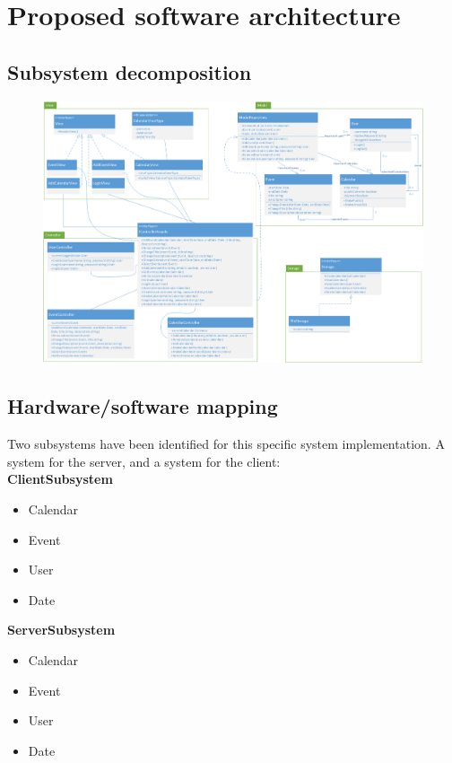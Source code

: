 \documentclass[10pt]{report}
\numberwithin{equation}{section} %
\numberwithin{figure}{section} %
\numberwithin{table}{section} %
\begin{document}
\section{Proposed software architecture}

\subsection{Subsystem decomposition}
\begin{figure}[H]
  \includegraphics[scale=0.40]{classdiagram.png}
\end{figure}

\subsection{Hardware/software mapping}
Two subsystems have been identified for this specific system implementation. A
system for the server, and a system for the client:\\
\textbf{ClientSubsystem}
\begin{itemize}
\item Calendar
\item Event
\item User
\item Date
\end{itemize}

\textbf{ServerSubsystem}
\begin{itemize}
\item Calendar
\item Event
\item User
\item Date
\end{itemize}
\end{document}
